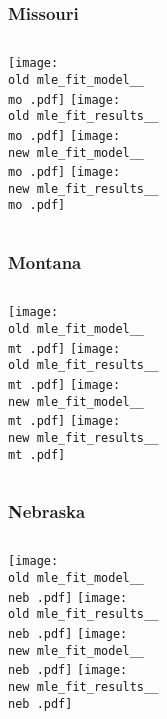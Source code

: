 \documentclass{beamer}
\newcommand{\old}{api-370-prod/pyseir/state_summaries/reports/}
\newcommand{\new}{new/pyseir/state_summaries/reports/}
\newcommand{\mo}{Missouri__29}
\newcommand{\mt}{Montana__30}
\newcommand{\neb}{Nebraska__31}
\begin{document}
\begin{frame}
\frametitle{Missouri}
    \begin{columns}[t]

       \texttt{[image: \\old mle\_fit\_model\_\_\\mo .pdf]}
       \texttt{[image: \\old mle\_fit\_results\_\_\\mo .pdf]}   
       \texttt{[image: \\new mle\_fit\_model\_\_\\mo .pdf]}
       \texttt{[image: \\new mle\_fit\_results\_\_\\mo .pdf]}   
\end{columns}
\end{frame}

\begin{frame}
\frametitle{Montana}
    \begin{columns}[t]

       \texttt{[image: \\old mle\_fit\_model\_\_\\mt .pdf]}
       \texttt{[image: \\old mle\_fit\_results\_\_\\mt .pdf]}   
       \texttt{[image: \\new mle\_fit\_model\_\_\\mt .pdf]}
       \texttt{[image: \\new mle\_fit\_results\_\_\\mt .pdf]}   
\end{columns}
\end{frame}

\begin{frame}
\frametitle{Nebraska}
    \begin{columns}[t]

       \texttt{[image: \\old mle\_fit\_model\_\_\\neb .pdf]}
       \texttt{[image: \\old mle\_fit\_results\_\_\\neb .pdf]}   
       \texttt{[image: \\new mle\_fit\_model\_\_\\neb .pdf]}
       \texttt{[image: \\new mle\_fit\_results\_\_\\neb .pdf]}   
\end{columns}
\end{frame}
\end{document}
